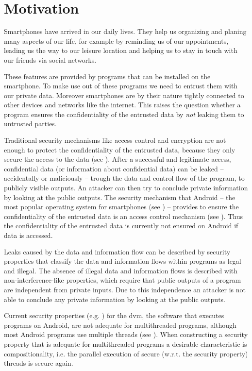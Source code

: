 \section{Motivation}
Smartphones have arrived in our daily lives. They help us organizing
and planing many aspects of our life, for example by reminding us of
our appointments, leading us the way to our leisure location and
helping us to stay in touch with our friends via social networks.

These features are provided by programs that can be installed on the
smartphone. To make use out of these programs we need to entrust them
with our private data. Moreover smartphones are by their nature
tightly connected to other devices and networks like the
internet. This raises the question whether a program ensures the
confidentiality of the entrusted data by \emph{not} leaking them to
untrusted parties.

Traditional security mechanisms like access control and encryption are
not enough to protect the confidentiality of the entrusted data,
because they only secure the access to the data (see
\cite{DBLP:journals/jsac/SabelfeldM03}). After a successful and
legitimate access, confidential data (or information about
confidential data) can be leaked -- accidentally or maliciously --
trough the data and control flow of the program, to publicly visible
outputs. An attacker can then try to conclude private information by
looking at the public outputs. The security mechanism that Android --
the most popular operating system for smartphones (see
\cite{gartner:android:marketshare}) -- provides to ensure the
confidentiality of the entrusted data is an access control mechanism
(see \cite{DBLP:conf/isw/DaviDSW10}). Thus the confidentiality of the
entrusted data is currently not ensured on Android if data is
accessed.

Leaks caused by the data and information flow can be described by
security properties that classify the data and information flows
within programs as legal and illegal. The absence of illegal data and
information flows is described with non-interference-like
\cite{DBLP:conf/sp/GoguenM82} properties, which require that public
outputs of a program are independent from private inputs. Due to this
independence an attacker is not able to conclude any private
information by looking at the public outputs.

Current security properties (e.g. \cite{alexandra:static:2011}) for
the \gls{dvm}, the software that executes programs on Android, are not
adequate for multithreaded programs, although most Android programs
use multiple threads (see \cite{Wognsen2012}). When constructing a
security property that is adequate for multithreaded programs a
desirable characteristic is compositionality, i.e. the parallel
execution of secure (w.r.t. the security property) threads is secure
again.


